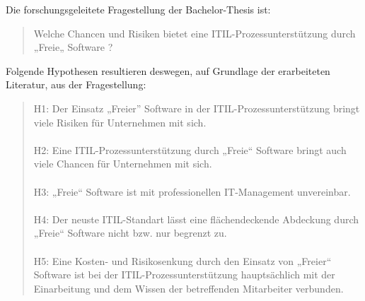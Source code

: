 Die forschungsgeleitete Fragestellung der Bachelor-Thesis ist:
\begin{quote}
	Welche Chancen und Risiken bietet eine ITIL-Prozessunterstützung durch „Freie„ Software ?
\end{quote}
Folgende Hypothesen resultieren deswegen, auf Grundlage der erarbeiteten Literatur, aus der Fragestellung:
\begin{quote}
H1: Der Einsatz „Freier” Software in der ITIL-Prozessunterstützung bringt viele Risiken für Unternehmen mit sich.\\
\\
H2: Eine ITIL-Prozessunterstützung durch „Freie“ Software bringt auch viele Chancen für Unternehmen mit sich.\\
\\
H3: „Freie“ Software ist mit professionellen IT-Management unvereinbar.\\
\\
H4: Der neuste ITIL-Standart lässt eine flächendeckende Abdeckung durch „Freie“ Software nicht bzw. nur begrenzt zu.\\
\\
H5: Eine Kosten- und Risikosenkung durch den Einsatz von „Freier“ Software ist bei der ITIL-Prozessunterstützung hauptsächlich mit der Einarbeitung und dem Wissen der betreffenden Mitarbeiter verbunden.
\end{quote}


